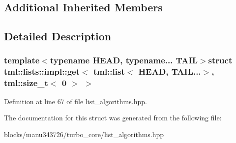 \subsection*{Additional Inherited Members}


\subsection{Detailed Description}
\subsubsection*{template$<$typename H\+E\+A\+D, typename... T\+A\+I\+L$>$struct tml\+::lists\+::impl\+::get$<$ tml\+::list$<$ H\+E\+A\+D, T\+A\+I\+L...$>$, tml\+::size\+\_\+t$<$ 0 $>$ $>$}



Definition at line 67 of file list\+\_\+algorithms.\+hpp.



The documentation for this struct was generated from the following file\+:\begin{DoxyCompactItemize}
\item 
blocks/manu343726/turbo\+\_\+core/list\+\_\+algorithms.\+hpp\end{DoxyCompactItemize}
